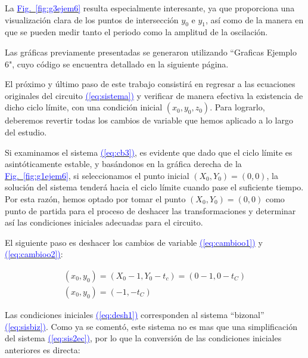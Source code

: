 \documentclass[12pt,a4paper]{report} %
\newcommand{\fref}[1]{\hyperref[#1]{\textcolor{blue}{Fig.~\ref*{#1}}}}
\newcommand{\eref}[1]{\hyperref[#1]{\textcolor{blue}{(\ref*{#1})}}}
\newcommand{\fref}[1]{\hyperref[#1]{\textcolor{blue}{\textit{Fig.~\ref*{#1}}}}}
\newcommand{\eref}[1]{\hyperref[#1]{\textcolor{blue}{\textit{(\ref*{#1})}}}}
\begin{document}
	\vspace{0.5cm} La \fref{fig:g3ejem6} resulta especialmente interesante, ya que proporciona una visualización clara de los puntos de intersección $y_0$ e $y_1$, así como de la manera en que se pueden medir tanto el periodo como la amplitud de la oscilación.
	
	\vspace{0.5cm} Las gráficas previamente presentadas se generaron utilizando ``Graficas Ejemplo 6", cuyo código se encuentra detallado en la siguiente página.
	
	\newpage
	
	\vspace{0.5cm}
	
	\newpage
	
	El próximo y último paso de este trabajo consistirá en regresar a las ecuaciones originales del circuito \eref{eq:sistema} y verificar de manera efectiva la existencia de dicho ciclo límite, con una condición inicial $(x_0,y_0,z_0)$. Para lograrlo, deberemos revertir todas los cambios de variable que hemos aplicado a lo largo del estudio. 
	
	\vspace{0.5cm}Si examinamos el sistema \eref{eq:cb3}, es evidente que dado que el ciclo límite es asintóticamente estable, y basándonos en la gráfica derecha de la \fref{fig:g1ejem6},  si seleccionamos el punto inicial $(X_0, Y_0) = (0, 0)$, la solución del sistema tenderá hacia el ciclo límite cuando pase el suficiente tiempo. Por esta razón, hemos optado por tomar el punto $(X_0, Y_0) = (0, 0)$ como punto de partida para el proceso de deshacer las transformaciones y determinar así las condiciones iniciales adecuadas para el circuito.
	
	\vspace{0.5cm}\noindent El siguiente paso es deshacer los cambios de variable \eref{eq:cambioo1} y \eref{eq:cambioo2}:
	
	\begin{equation}
		\label{eq:desh1}
		\begin{gathered}
			(x_0,y_0)=\left( X_0-1,Y_0-t_c \right) = (0-1,0-t_C) \\[5mm]
			(x_0,y_0)=(-1,-t_C)
		\end{gathered}
	\end{equation}\smallskip
	
	
		\vspace{0.5cm} Las condiciones iniciales \eref{eq:desh1} corresponden al sistema ``bizonal'' \eref{eq:sisbiz}. Como ya se comentó, este sistema no es mas que una simplificación del sistema \eref{eq:sis2ec}, por lo que la conversión de las condiciones iniciales anteriores es directa:	
	
\end{document}
